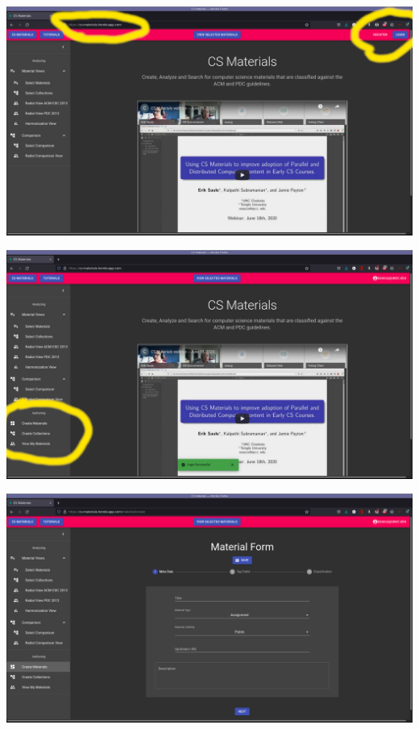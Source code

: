 \documentclass[aspectratio=169]{beamer}
\begin{document}
\begin{frame}
  \includegraphics[width=\linewidth]{structure_figs/csmat1.png}
\end{frame}
\begin{frame}
  \includegraphics[width=\linewidth]{structure_figs/csmat2.png}
\end{frame}
\begin{frame}
  \includegraphics[width=\linewidth]{structure_figs/csmat3.png}
\end{frame}
\end{document}
